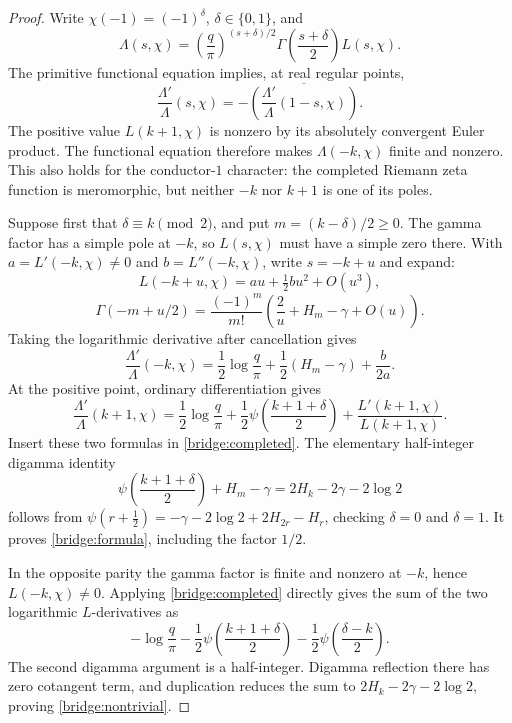 \documentclass[11pt,a4paper]{article}
\theoremstyle{definition}
\theoremstyle{remark}
\numberwithin{equation}{section}
\begin{document}
\begin{proof}
Write $\chi(-1)=(-1)^\delta$, $\delta\in\{0,1\}$, and
\[
 \Lambda(s,\chi)=
 \left(\frac q\pi\right)^{(s+\delta)/2}
 \Gamma\left(\frac{s+\delta}{2}\right)L(s,\chi).
\]
The primitive functional equation \cite{DLMF25} implies, at real regular points,
\begin{equation}\label{bridge:completed}
 \frac{\Lambda'}{\Lambda}(s,\chi)
 =-\overline{\left(
       \frac{\Lambda'}{\Lambda}(1-s,\chi)\right)}.
\end{equation}
The positive value $L(k+1,\chi)$ is nonzero by its absolutely convergent
Euler product.  The functional equation therefore makes
$\Lambda(-k,\chi)$ finite and nonzero.  This also holds for the
conductor-$1$ character: the completed Riemann zeta function is
meromorphic, but neither $-k$ nor $k+1$ is one of its poles.

Suppose first that $\delta\equiv k\pmod2$, and put
$m=(k-\delta)/2\geq0$.  The gamma factor has a simple pole at $-k$,
so $L(s,\chi)$ must have a simple zero there.  With
$a=L'(-k,\chi)\ne0$ and $b=L''(-k,\chi)$, write $s=-k+u$ and expand:
\[
 L(-k+u,\chi)=a u+\tfrac12 b u^2+O(u^3),
\]
\[
 \Gamma(-m+u/2)=\frac{(-1)^m}{m!}
       \left(\frac2u+H_m-\gamma+O(u)\right).
\]
Taking the logarithmic derivative after cancellation gives
\begin{equation}\label{bridge:regularized-log}
 \frac{\Lambda'}{\Lambda}(-k,\chi)
 =\frac12\log\frac q\pi
  +\frac12(H_m-\gamma)+\frac{b}{2a}.
\end{equation}
At the positive point, ordinary differentiation gives
\[
 \frac{\Lambda'}{\Lambda}(k+1,\chi)
 =\frac12\log\frac q\pi
  +\frac12\psi\left(\frac{k+1+\delta}{2}\right)
  +\frac{L'(k+1,\chi)}{L(k+1,\chi)}.
\]
Insert these two formulas in \eqref{bridge:completed}.  The elementary
half-integer digamma identity \cite{DLMF5}
\[
 \psi\left(\frac{k+1+\delta}{2}\right)+H_m-\gamma
 =2H_k-2\gamma-2\log2
\]
follows from $\psi(r+\tfrac12)=-\gamma-2\log2+2H_{2r}-H_r$,
checking $\delta=0$ and $\delta=1$.  It proves
\eqref{bridge:formula}, including the factor $1/2$.

In the opposite parity the gamma factor is finite and nonzero at
$-k$, hence $L(-k,\chi)\ne0$.  Applying
\eqref{bridge:completed} directly gives the sum of the two logarithmic
$L$-derivatives as
\[
 -\log\frac q\pi
 -\frac12\psi\left(\frac{k+1+\delta}{2}\right)
 -\frac12\psi\left(\frac{\delta-k}{2}\right).
\]
The second digamma argument is a half-integer.  Digamma reflection
there has zero cotangent term, and duplication reduces the sum to
$2H_k-2\gamma-2\log2$, proving
\eqref{bridge:nontrivial}.
\end{proof}
\end{document}
